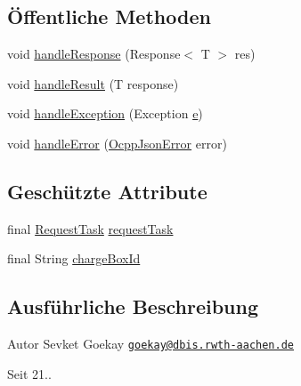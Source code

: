 \subsection*{Öffentliche Methoden}
\begin{DoxyCompactItemize}
\item 
void \hyperlink{classde_1_1rwth_1_1idsg_1_1steve_1_1handler_1_1_abstract_ocpp_response_handler_3_01_t_01_4_a06017636cf97d4a5f1daebe44e940f7e}{handle\-Response} (Response$<$ T $>$ res)
\item 
void \hyperlink{classde_1_1rwth_1_1idsg_1_1steve_1_1handler_1_1_abstract_ocpp_response_handler_3_01_t_01_4_ab326f0759b1ef1fa08895a5f6e1fe3f3}{handle\-Result} (T response)
\item 
void \hyperlink{classde_1_1rwth_1_1idsg_1_1steve_1_1handler_1_1_abstract_ocpp_response_handler_3_01_t_01_4_a171ae542fba4f9da7f5a531263a9d7c8}{handle\-Exception} (Exception \hyperlink{jquery-ui_8min_8js_a2c038346d47955cbe2cb91e338edd7e1}{e})
\item 
void \hyperlink{classde_1_1rwth_1_1idsg_1_1steve_1_1handler_1_1_abstract_ocpp_response_handler_3_01_t_01_4_ace2a08be261a858fb0ee9a29dac0d421}{handle\-Error} (\hyperlink{classde_1_1rwth_1_1idsg_1_1steve_1_1ocpp_1_1ws_1_1data_1_1_ocpp_json_error}{Ocpp\-Json\-Error} error)
\end{DoxyCompactItemize}
\subsection*{Geschützte Attribute}
\begin{DoxyCompactItemize}
\item 
final \hyperlink{classde_1_1rwth_1_1idsg_1_1steve_1_1web_1_1_request_task}{Request\-Task} \hyperlink{classde_1_1rwth_1_1idsg_1_1steve_1_1handler_1_1_abstract_ocpp_response_handler_3_01_t_01_4_afbad6820ded6580e25792d7a4b893465}{request\-Task}
\item 
final String \hyperlink{classde_1_1rwth_1_1idsg_1_1steve_1_1handler_1_1_abstract_ocpp_response_handler_3_01_t_01_4_a8c07bdb598803efe236906c96a8d21a6}{charge\-Box\-Id}
\end{DoxyCompactItemize}


\subsection{Ausführliche Beschreibung}
\begin{DoxyAuthor}{Autor}
Sevket Goekay \href{mailto:goekay@dbis.rwth-aachen.de}{\tt goekay@dbis.\-rwth-\/aachen.\-de} 
\end{DoxyAuthor}
\begin{DoxySince}{Seit}
21.. 
\end{DoxySince}


